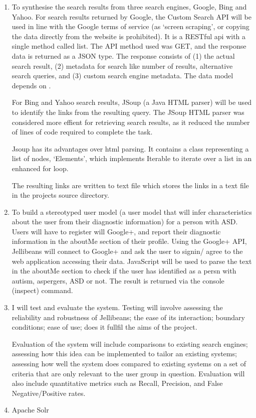\documentclass[a4paper, 11pt]{article}
\begin{document}
\begin{enumerate}
\item{
To synthesise the search results from three search engines, Google, Bing and Yahoo. For search results returned by Google, the Custom Search API will be used in line with the Google terms of service (as `screen scraping', or copying the data directly from the website is prohibited). It is a RESTful api with a single method called list. The API method used was GET, and the response data is returned as a JSON type. The response consists of (1) the actual search result, (2) metadata for search like number of  results, alternative search queries, and (3) custom search engine metadata. The data model depends on \cite{opensearch}.

For Bing and Yahoo search results, JSoup (a Java HTML parser) will be used to identify the links from the resulting query. The JSoup HTML parser was considered more effient for retrieving search results, as it reduced the number of lines of code required to complete the task. 

Jsoup has its advantages over html parsing. It contains a class representing a list of nodes, `Elements', which implements Iterable to iterate over a list in an enhanced for loop.

The resulting links are written to text file which stores the links in a text file in the projects source directory.}

\item{
To build a stereotyped user model (a user model that will infer characteristics about the user from their diagnostic information) for a person with ASD. Users will have to register will Google+, and report their diagnostic information in the aboutMe section of their profile. Using the Google+ API, Jellibeans will connect to Google+ and ask the user to signin/ agree to the web application accessing their data. JavaScript will be used to parse the text in the aboutMe section to check if the user has identified as a persn with autism, aspergers, ASD or not. The result is returned via the console (inspect) command.
}

\item{
I will test and evaluate the system. Testing will involve assessing the reliability and robustness of Jellibeans; the ease of its interaction; boundary conditions; ease of use; does it fullfil the aims of the project.\n 

Evaluation of the system will include comparisons to existing search engines; assessing how this idea can be implemented to tailor an existing systems; assessing how well the system does compared to existing systems on a set of criteria that are only relevant to the user group in question. Evaluation will also include quantitative metrics such as Recall, Precision, and False Negative/Positive rates.
}

\item {Apache Solr}



\end{enumerate}
\end{document}
